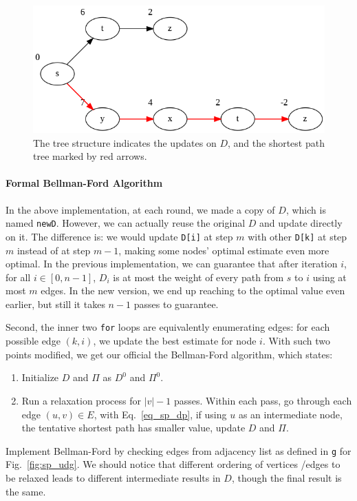 \documentclass[../main.tex]{subfiles}
\begin{document}
\begin{figure}[!ht]
    \centering
    \includegraphics[width=0.7\columnwidth]{fig/shortest_path_dp_1.png}
    \caption{The tree structure indicates the updates on $D$, and the shortest path tree marked by red arrows. }
    \label{fig:bellman_ford_2}
\end{figure}
\paragraph{Formal Bellman-Ford Algorithm}
In the above implementation, at each round, we made a copy of $D$, which is named \texttt{newD}. However, we can actually reuse the original $D$ and update directly on it. The difference is: we would update \texttt{D[i]} at step $m$ with other \texttt{D[k]} at step $m$ instead of at step $m-1$, making some nodes' optimal estimate even more optimal. In the previous implementation, we can guarantee that after iteration $i$, for all $i \in [0, n-1]$, $D_i$ is at most the weight of every path from $s$ to $i$ using at most $m$ edges. In the new version, we end up reaching to the optimal value even earlier, but still it takes $n-1$ passes to guarantee. 

Second, the inner two \texttt{for} loops are equivalently enumerating edges: for each possible edge $(k, i)$, we update the best estimate for node $i$. With such two points modified, we get our official the Bellman-Ford algorithm, which states:
\begin{enumerate}
    \item Initialize $D$ and $\Pi$ as $D^{0}$ and $\Pi^0$.
    \item Run a relaxation process for $|v|-1$ passes. Within  each pass, go through each edge $(u, v) \in E$, with Eq.~\ref{eq_sp_dp}, if using $u$ as an intermediate node, the tentative shortest path has smaller value, update $D$ and $\Pi$. 
\end{enumerate}
\begin{bclogo}[couleur = blue!30, arrondi=0.1,logo=\bccrayon,ombre=true]{Implement Bellman-Ford by checking edges from adjacency list as defined in \texttt{g} for Fig.~\ref{fig:sp_udg}. We should notice that different ordering of vertices /edges to be relaxed leads to different intermediate results in $D$, though the final result is the same.} 
\end{bclogo}
\end{document}
